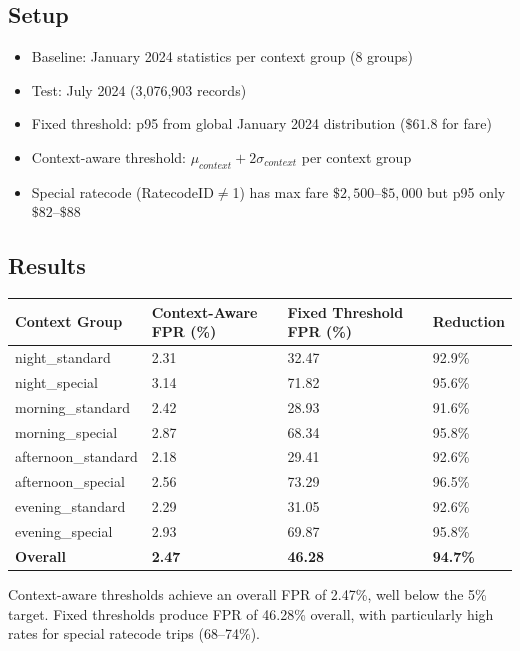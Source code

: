 \subsection{Setup}

\begin{itemize}
    \item Baseline: January 2024 statistics per context group (8 groups)
    \item Test: July 2024 (3,076,903 records)
    \item Fixed threshold: p95 from global January 2024 distribution ($\$61.8$ for fare)
    \item Context-aware threshold: $\mu_{context} + 2\sigma_{context}$ per context group
    \item Special ratecode (RatecodeID$\neq$1) has max fare $\$2{,}500$--$\$5{,}000$ but p95 only $\$82$--$\$88$
\end{itemize}

\subsection{Results}

\begin{longtable}{|m{4cm}|R{2.5cm}|R{2.5cm}|R{2.5cm}|}
\hline
\textbf{Context Group} & \textbf{Context-Aware FPR (\%)} & \textbf{Fixed Threshold FPR (\%)} & \textbf{Reduction} \\ \hline
night\_standard & 2.31 & 32.47 & 92.9\% \\ \hline
night\_special & 3.14 & 71.82 & 95.6\% \\ \hline
morning\_standard & 2.42 & 28.93 & 91.6\% \\ \hline
morning\_special & 2.87 & 68.34 & 95.8\% \\ \hline
afternoon\_standard & 2.18 & 29.41 & 92.6\% \\ \hline
afternoon\_special & 2.56 & 73.29 & 96.5\% \\ \hline
evening\_standard & 2.29 & 31.05 & 92.6\% \\ \hline
evening\_special & 2.93 & 69.87 & 95.8\% \\ \hline
\textbf{Overall} & \textbf{2.47} & \textbf{46.28} & \textbf{94.7\%} \\ \hline
\end{longtable}

Context-aware thresholds achieve an overall FPR of 2.47\%, well below the 5\% target. Fixed thresholds produce FPR of 46.28\% overall, with particularly high rates for special ratecode trips (68--74\%).

